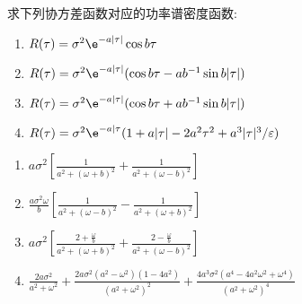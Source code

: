 \begin{problem}{4.27}
求下列协方差函数对应的功率谱密度函数:
\begin{enumerate}[label=(\arabic*)]
	\item $R(\tau) = \sigma^2 \e^{-a|\tau|}\cos b\tau$
	\item $R(\tau) = \sigma^2 \e^{-a|\tau|}(\cos b\tau - ab^{-1}\sin b|\tau|)$
	\item $R(\tau) = \sigma^2 \e^{-a|\tau|}(\cos b\tau + ab^{-1}\sin b|\tau|)$
	\item $R(\tau) = \sigma^2 \e^{-a|\tau}(1 + a|\tau| - 2a^2 \tau^2 +a^3|\tau|^3/\varepsilon)$
\end{enumerate}
\end{problem}
\begin{solution}
	\begin{enumerate}[label=(\arabic*)]
		\item $a\sigma^2 \left[\frac{1}{a^2+(\omega+b)^2}+\frac{1}{a^2+(\omega-b)^2}\right]$
		\item $\frac{a\sigma^2 \omega}{b}\left[\frac{1}{a^2+(\omega-b)^2}-\frac{1}{a^2+(\omega+b)^2}\right]$
		\item $a\sigma^2 \left[\frac{2+\frac{\omega}{b}}{a^2+(\omega+b)^2}+\frac{2-\frac{\omega}{b}}{a^2+(\omega-b)^2}\right]$
		\item $\frac{2a\sigma^2}{a^2+\omega^2}+\frac{2a\sigma^2 (a^2-\omega^2)(1-4a^2)}{(a^2+\omega^2)^2}+\frac{4a^3 \sigma^2 (a^4 -4a^2 \omega^2+\omega^4)}{(a^2+\omega^2)^4}$
	\end{enumerate}
\end{solution}


